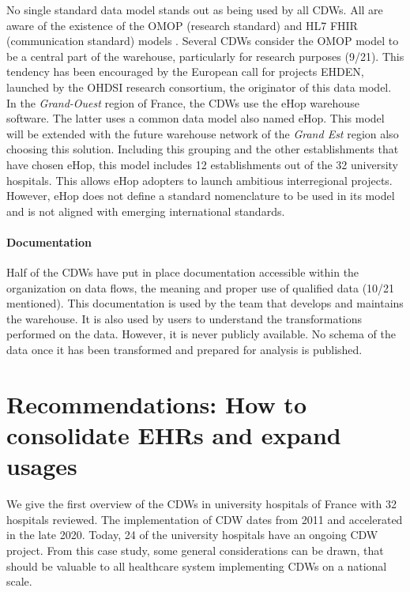 \documentclass[french,12pt,twoside,a4paper]{book}
\begin{document}
No single standard data model stands out as being used by all CDWs. All are
aware of the existence of the OMOP (research standard)
\citep{hripcsak_observational_2015} and HL7 FHIR (communication standard) models
\citep{braunstein_health_2019}. Several CDWs consider the OMOP model to be a
central part of the warehouse, particularly for research purposes (9/21). This
tendency has been encouraged by the European call for projects EHDEN, launched
by the OHDSI research consortium, the originator of this data model. In the
\textit{Grand-Ouest} region of France, the CDWs use the eHop warehouse software.
The latter uses a common data model also named eHop. This model will be extended
with the future warehouse network of the  \textit{Grand Est} region also
choosing this solution. Including this grouping and the other establishments
that have chosen eHop, this model includes 12 establishments out of the 32
university hospitals. This allows eHop adopters to launch ambitious
interregional projects. However, eHop does not define a standard nomenclature to
be used in its model and is not aligned with emerging international standards.

\paragraph{Documentation}

Half of the CDWs have put in place documentation accessible within the
organization on data flows, the meaning and proper use of qualified data (10/21
mentioned). This documentation is used by the team that develops and maintains
the warehouse. It is also used by users to understand the transformations
performed on the data. However, it is never publicly available. No schema of the
data once it has been transformed and prepared for analysis is published.

\section{Recommendations: How to consolidate EHRs and expand usages}%
\label{sec:cdw:recommendations}%

We give the first overview of the CDWs in university hospitals of France with 32
hospitals reviewed. The implementation of CDW dates from 2011 and accelerated in
the late 2020. Today, 24 of the university hospitals have an ongoing CDW
project.
From this case study, some general considerations can be drawn, that should be
valuable to all healthcare system implementing CDWs on a national scale.
\end{document}
